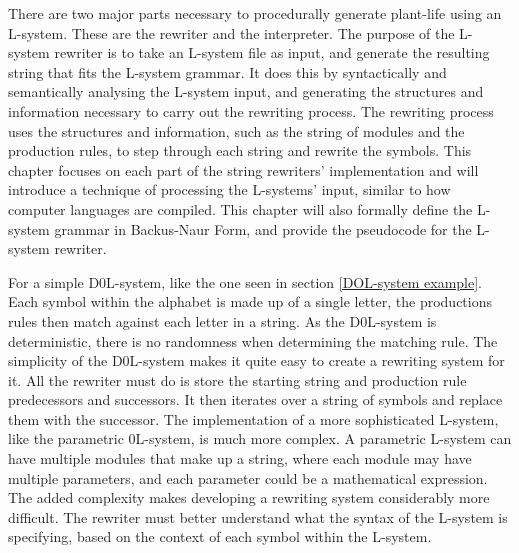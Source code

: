 
\lettrine[lines=3]{T}{}here are two major parts necessary to procedurally generate plant-life using an L-system. These are the rewriter and the interpreter. The purpose of the L-system rewriter is to take an L-system file as input, and generate the resulting string that fits the L-system grammar. It does this by syntactically and semantically analysing the L-system input, and generating the structures and information necessary to carry out the rewriting process. The rewriting process uses the structures and information, such as the string of modules and the production rules, to step through each string and rewrite the symbols. This chapter focuses on each part of the string rewriters' implementation and will introduce a technique of processing the L-systems' input, similar to how computer languages are compiled. This chapter will also formally define the L-system grammar in Backus-Naur Form, and provide the pseudocode for the L-system rewriter. 

For a simple D0L-system, like the one seen in section \ref{DOL-system example}. Each symbol within the alphabet is made up of a single letter, the productions rules then match against each letter in a string. As the D0L-system is deterministic, there is no randomness when determining the matching rule. The simplicity of the D0L-system makes it quite easy to create a rewriting system for it. All the rewriter must do is store the starting string and production rule predecessors and successors. It then iterates over a string of symbols and replace them with the successor. The implementation of a more sophisticated L-system, like the parametric 0L-system, is much more complex. A parametric L-system can have multiple modules that make up a string, where each module may have multiple parameters, and each parameter could be a mathematical expression. The added complexity makes developing a rewriting system considerably more difficult. The rewriter must better understand what the syntax of the L-system is specifying, based on the context of each symbol within the L-system.

